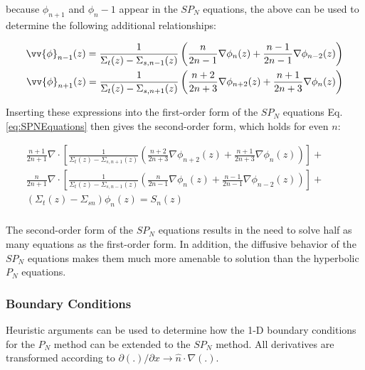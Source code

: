 \documentclass[10pt]{article}
\begin{document}
\begin{flushleft}
because \(\phi_{n+1}\) and \(\phi_n-1\) appear in the \(SP_N\) equations, the above can be used to determine the following additional relationships:

\begin{equation}
\begin{aligned}
\vv{\phi}_{n-1}(z)=\frac{1}{\Sigma_t(z)-\Sigma_{s,n-1}(z)}\left(\frac{n}{2n-1}\nabla\phi_{n}(z)+\frac{n-1}{2n-1}\nabla\phi_{n-2}(z)\right)\\
\vv{\phi}_{n+1}(z)=\frac{1}{\Sigma_t(z)-\Sigma_{s,n+1}(z)}\left(\frac{n+2}{2n+3}\nabla\phi_{n+2}(z)+\frac{n+1}{2n+3}\nabla\phi_{n}(z)\right)\\
\end{aligned}
\end{equation}

Inserting these expressions into the first-order form of the \(SP_N\) equations Eq. \eqref{eq:SPNEquations} then gives the second-order form, which holds for even \(n\):

\begin{equation}
\label{eq:SPNEquations}
\begin{aligned}
\frac{n+1}{2n+1}\nabla\cdot\left\lbrack\frac{1}{\Sigma_t(z)-\Sigma_{s,n+1}(z)}\left(\frac{n+2}{2n+3}\nabla\phi_{n+2}(z)+\frac{n+1}{2n+3}\nabla\phi_{n}(z)\right)\right\rbrack+\quad\quad\\
\frac{n}{2n+1}\nabla\cdot\left\lbrack\frac{1}{\Sigma_t(z)-\Sigma_{s,n-1}(z)}\left(\frac{n}{2n-1}\nabla\phi_{n}(z)+\frac{n-1}{2n-1}\nabla\phi_{n-2}(z)\right)\right\rbrack+\quad\quad\\
 (\Sigma_t(z)-\Sigma_{sn})\phi_n(z)= S_n(z)\\
\end{aligned}
 \end{equation}

The second-order form of the \(SP_N\) equations results in the need to solve half as many equations as the first-order form. In addition, the diffusive behavior of the \(SP_N\) equations makes them much more amenable to solution than the hyperbolic \(P_N\) equations. 

\subsubsection{Boundary Conditions}

Heuristic arguments can be used to determine how the 1-D boundary conditions for the \(P_N\) method can be extended to the \(SP_N\) method. All derivatives are transformed according to \(\partial(.)/\partial x\rightarrow\hat{n}\cdot\nabla(.)\). 


\end{flushleft}
\end{document}
